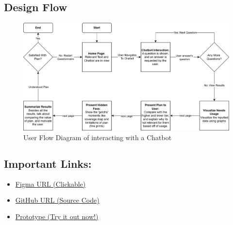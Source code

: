 \documentclass[conference]{IEEEtran}
\begin{document}
\subsection{Design Flow}
\begin{figure}[H]
    \centering
    \includegraphics[width=1\linewidth]{FlowChart_357.png}
    \caption{User Flow Diagram of interacting with a Chatbot}
    \label{fig:user flow}
\end{figure}
\subsection{Important Links:}
\begin{itemize}
    \item \href{https://www.figma.com/design/3bhrHSNXqwNiBmlOOrQMPk/SOEN357_Project?node-id=0-1&t=nTcesERC59Hllvib-1}{Figma URL (Clickable)}
    \item \href{https://github.com/briantkatch/357-my-little-chomsky}{GitHub URL (Source Code)}
    \item \href{https://page.joonbot.com/4d81814c-8f84-489a-9956-159db0459389}{Prototype (Try it out now!)}
\end{itemize}
\end{document}
